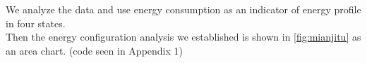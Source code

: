 \documentclass{mcmthesis}
\begin{document}
We analyze the data and use energy consumption as an indicator of energy profile in four states.\\
Then the energy configuration analysis we established is shown in \autoref{fig:mianjitu} as an area chart. (code seen in Appendix 1)\\
\begin{figure}[h]
	\centering                                             %
\end{figure}
\end{document}
